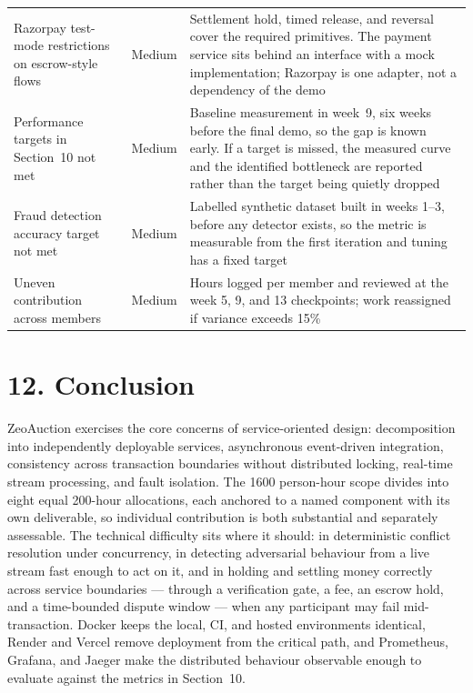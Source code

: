 \documentclass[11pt, a4paper]{article}
\newcommand{\secgap}{\vspace{0.06in}}
\begin{document}
{\begin{longtable}{@{}p{1.65in} p{0.7in} p{3.2in}@{}}
Razorpay test-mode restrictions on escrow-style flows & Medium & Settlement hold, timed release, and reversal cover the required primitives. The payment service sits behind an interface with a mock implementation; Razorpay is one adapter, not a dependency of the demo \\
Performance targets in Section~10 not met & Medium & Baseline measurement in week~9, six weeks before the final demo, so the gap is known early. If a target is missed, the measured curve and the identified bottleneck are reported rather than the target being quietly dropped \\
Fraud detection accuracy target not met & Medium & Labelled synthetic dataset built in weeks 1--3, before any detector exists, so the metric is measurable from the first iteration and tuning has a fixed target \\
Uneven contribution across members & Medium & Hours logged per member and reviewed at the week 5, 9, and 13 checkpoints; work reassigned if variance exceeds 15\% \\
\bottomrule
\end{longtable}
}

\secgap
\newpage
\section*{12. Conclusion}

ZeoAuction exercises the core concerns of service-oriented design: decomposition into
independently deployable services, asynchronous event-driven integration, consistency
across transaction boundaries without distributed locking, real-time stream processing, and
fault isolation. The 1600 person-hour scope divides into eight equal 200-hour allocations,
each anchored to a named component with its own deliverable, so individual contribution is
both substantial and separately assessable.
The technical difficulty sits where it should: in deterministic conflict resolution under
concurrency, in detecting adversarial behaviour from a live stream fast enough to act on it,
and in holding and settling money correctly across service boundaries --- through a
verification gate, a fee, an escrow hold, and a time-bounded dispute window --- when any
participant may fail mid-transaction. Docker keeps the local, CI, and hosted environments
identical, Render and Vercel remove deployment from the critical path, and Prometheus,
Grafana, and Jaeger make the distributed behaviour observable enough to evaluate against
the metrics in Section~10.
\end{document}
